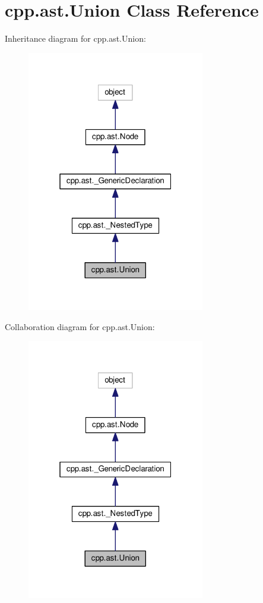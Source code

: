 \hypertarget{classcpp_1_1ast_1_1Union}{}\section{cpp.\+ast.\+Union Class Reference}
\label{classcpp_1_1ast_1_1Union}


Inheritance diagram for cpp.\+ast.\+Union\+:
\nopagebreak
\begin{figure}[H]
\begin{center}
\leavevmode
\includegraphics[width=220pt]{classcpp_1_1ast_1_1Union__inherit__graph}
\end{center}
\end{figure}


Collaboration diagram for cpp.\+ast.\+Union\+:
\nopagebreak
\begin{figure}[H]
\begin{center}
\leavevmode
\includegraphics[width=220pt]{classcpp_1_1ast_1_1Union__coll__graph}
\end{center}
\end{figure}

